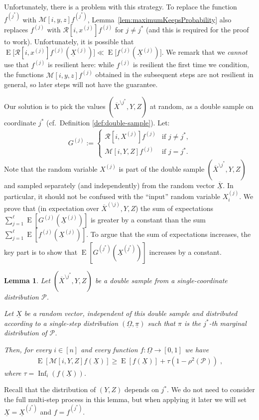\documentclass{daj}
\newcommand{\1}{\mathbbm{1}}
\theoremstyle{plain}
\newtheorem{lemma}[theorem]{Lemma}
\theoremstyle{definition}
\DeclareMathOperator*{\EE}{E}
\DeclareMathOperator{\Inf}{Inf}
\newcommand{\cM}{\mathcal{M}}
\newcommand{\cR}{\mathcal{R}}
\begin{document}
Unfortunately, there is a problem with this strategy.  To replace 
the function $f^{(j^*)}$ with
$\cM[i,y,z] f^{(j^*)}$, Lemma~\ref{lem:maximumKeepsProbability} also
replaces $f^{(j)}$ with $\cR[i,x^{(j)}]f^{(j)}$ for $j \ne j^*$ (and this is
required for the proof to work).  Unfortunately, it is possible that
$\EE\Big[\cR[i,x^{(j)}]f^{(j)}(\underline{X}^{(j)})\Big] \ll
\EE\Big[f^{(j)}(\underline{X}^{(j)})\Big]$.
We remark that we \emph{cannot} use that $f^{(j)}$ is resilient here: while
$f^{(j)}$ is resilient the first time we condition, the functions
$\cM[i,y,z] f^{(j)}$ obtained in the subsequent steps are not resilient in general,
so later steps will not have the guarantee.

\medskip

Our solution is to pick the values $(\overline{X}^{\setminus j^*}, Y, Z)$ at
random, as a double sample on coordinate $j^*$ 
(cf.~Definition \ref{def:double-sample}).
Let:
\begin{align*}
  G^{(j)} := \begin{cases}
    \cR[i,X^{(j)}]f^{(j)} &\text{if $j \ne j^*$,}\\
    \cM[i, Y, Z]f^{(j)}  &\text{if $j = j^*$.}
  \end{cases}
\end{align*}
Note that the random variable $X^{(j)}$ is part of the double sample
$(\overline{X}^{\setminus j^*}, Y, Z)$ and sampled separately (and independently)
from the random vector $\overline{\underline{X}}$. In particular, it should
not be confused with the ``input'' random variable $X_i^{(j)}$.
We prove that (in expectation over 
$\overline{X}^{(\setminus j)},Y,Z$) the sum of expectations
$\sum_{j=1}^\ell \EE[G^{(j)}(\underline{X}^{(j)})]$ is greater by a constant than
the sum $\sum_{j=1}^\ell \EE[f^{(j)}(\underline{X}^{(j)})]$.
To argue that the sum of expectations increases, the key part is to show that
$\EE\left[ G^{(j^*)}(\underline{X}^{(j^*)}) \right]$ increases by a constant.

\begin{lemma}\label{lem:fjNormIncrease}
Let $(\overline{X}^{\setminus j^*}, Y, Z)$ be a double sample from a
single-coordinate distribution $\mathcal{P}$.

Let $\underline{X}$ be a random vector, independent of this double sample
and distributed according to a single-step
distribution $(\underline{\Omega}, \underline{\pi})$ such that
$\pi$ is the $j^*$-th marginal distribution of $\mathcal{P}$.

Then, for every $i \in [n]$ and every function 
$f: \underline{\Omega} \to [0,1]$ we have
\begin{align}
\EE\left[
   \mathcal{M}[i,Y,Z]f(\underline{X}) \right]
\geq
\EE[f(\underline{X})] + \tau (1-\rho^2(\mathcal{P})) \; ,
\end{align}
where $\tau = \Inf_{i}(f(\underline{X}))$.
\end{lemma}
Recall that the distribution of $(Y,Z)$ depends on $j^*$.
We do not need to
consider the full multi-step process in this lemma, but when applying it later
we will set $\underline{X} = \underline{X}^{(j^*)}$ and $f = f^{(j^*)}$.
\end{document}
